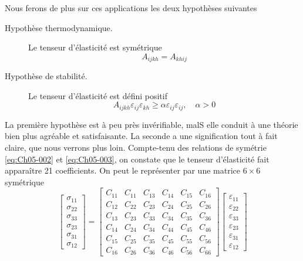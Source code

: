 Nous ferons de plus sur ces applications les deux hypothèses suivantes
\begin{description}
    \item[Hypothèse thermodynamique.] Le tenseur d'élasticité est symétrique
        \begin{equation}
            A_{ijkh} = A_{khij}
            \label{eq:Ch05-003}
        \end{equation}
    \item[Hypothèse de stabilité.] Le tenseur d'élasticité est défini positif
        \begin{equation}
            A_{ijkh} \varepsilon_{ij} \varepsilon_{kh} \geq \alpha \varepsilon_{ij} \varepsilon_{ij}, \quad \alpha > 0
            \label{eq:Ch05-004}
        \end{equation}
\end{description}

La première hypothèse est à peu près invérifiable, malS elle con­duit à une théorie bien plus agréable et satisfaisante.
La seconde a une signification tout à fait claire, que nous verrons plus loin.
Compte-tenu des relations de symétrie \eqref{eq:Ch05-002} et \eqref{eq:Ch05-003}, on constate que le tenseur d'élasticité fait apparaître 21 coefficients.
On peut le représenter par une matrice $6\times6$ symétrique
\begin{equation}
    \begin{bmatrix}
        \sigma_{11}\\
        \sigma_{22}\\
        \sigma_{33}\\
        \sigma_{23}\\
        \sigma_{31}\\
        \sigma_{12}
    \end{bmatrix}
    =
    \begin{bmatrix}
        C_{11} & C_{11} & C_{13} & C_{14} & C_{15} & C_{16} \\
        C_{12} & C_{22} & C_{23} & C_{24} & C_{25} & C_{26} \\
        C_{13} & C_{23} & C_{33} & C_{34} & C_{35} & C_{36} \\
        C_{14} & C_{24} & C_{34} & C_{44} & C_{45} & C_{46} \\
        C_{15} & C_{25} & C_{35} & C_{45} & C_{55} & C_{56} \\
        C_{16} & C_{26} & C_{36} & C_{46} & C_{56} & C_{66}
    \end{bmatrix}
    \begin{bmatrix}
        \varepsilon_{11}\\
        \varepsilon_{22}\\
        \varepsilon_{33}\\
        \varepsilon_{23}\\
        \varepsilon_{31}\\
        \varepsilon_{12}
    \end{bmatrix}
    \label{eq:Ch05-005}
\end{equation}

